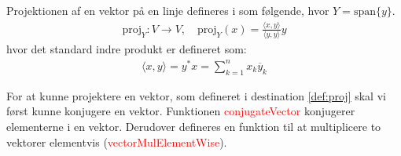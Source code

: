 \begin{definition}\label{def:proj}
Projektionen af en vektor på en linje defineres i som følgende, hvor $Y = \text{span}\{y\}$.
\begin{align}
    \text{proj}_Y : V \rightarrow V, \quad \text{proj}_Y(x) = \frac{\langle x, y \rangle}{\langle y, y \rangle} y
\end{align}
hvor det standard indre produkt er defineret som:
\begin{align}
    \langle x, y \rangle = y^* x = \sum_{k=1}^{n} x_k \overline{y}_k
\end{align}
\end{definition}
    






% 


For at kunne projektere en vektor, som defineret i destination \ref{def:proj} skal vi først kunne konjugere en vektor. Funktionen \textcolor{red}{conjugateVector} konjugerer elementerne i en vektor. Derudover defineres en funktion til at multiplicere to vektorer elementvis (\textcolor{red}{vectorMulElementWise}).

